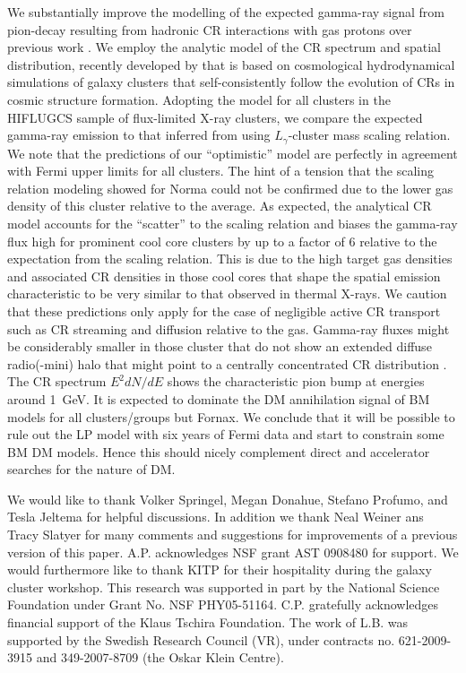 \documentclass[10pt,aps,pra,reprint,amsmath,amsfonts,amssymb,showpacs,nofootinbib,floatfix]{revtex4-1}
\begin{document}
We substantially improve the modelling of the expected gamma-ray
signal from pion-decay resulting from hadronic CR interactions with
gas protons over previous work \citep{2010ApJ...717L..71A}. We employ
the analytic model of the CR spectrum and spatial distribution,
recently developed by \citet{2010MNRAS.409..449P} that is based on
cosmological hydrodynamical simulations of galaxy clusters that self-consistently follow
the evolution of CRs in cosmic structure formation. Adopting the model
for all clusters in the HIFLUGCS sample of flux-limited X-ray
clusters, we compare the expected gamma-ray emission to that inferred
from using $L_\gamma$-cluster mass scaling relation. We note that the
predictions of our ``optimistic'' model are perfectly in agreement
with Fermi upper limits for all clusters.  The hint of a tension that
the scaling relation modeling showed for Norma
\citep{2010ApJ...717L..71A} could not be confirmed due to the
 lower gas density of this cluster relative to the average.
As expected, the analytical CR model accounts for the ``scatter'' to the scaling
relation and biases the gamma-ray flux high for prominent cool core
clusters by up to a factor of 6 relative to the expectation from the
scaling relation. This is due to the high target gas densities and
associated CR densities in those cool cores that shape the spatial
emission characteristic to be very similar to that observed in thermal
X-rays. We caution that these predictions only apply for the case of
negligible active CR transport such as CR streaming and diffusion
relative to the gas. Gamma-ray fluxes might be considerably smaller in those
cluster that do not show an extended diffuse radio(-mini) halo that
might point to a centrally concentrated CR distribution
\citep{2011A&A...527A..99E}. The CR spectrum $E^2 dN/dE$ shows the
characteristic pion bump at energies around 1~GeV. It is expected to
dominate the DM annihilation signal of BM models for all
clusters/groups but Fornax. We conclude that it will be possible to
rule out the LP model with six years of Fermi data and start to
constrain some BM DM models. Hence this should nicely complement
direct and accelerator searches for the nature of DM.






\smallskip We would like to thank Volker Springel, Megan Donahue,
Stefano Profumo, and Tesla Jeltema for helpful discussions.  In
addition we thank Neal Weiner ans Tracy Slatyer for many comments and
suggestions for improvements of a previous version of this
paper. A.P. acknowledges NSF grant AST 0908480 for support. We would
furthermore like to thank KITP for their hospitality during the galaxy
cluster workshop.  This research was supported in part by the National
Science Foundation under Grant No. NSF PHY05-51164.  C.P. gratefully
acknowledges financial support of the Klaus Tschira Foundation. The
work of L.B. was supported by the Swedish Research Council (VR), under
contracts no. 621-2009-3915 and 349-2007-8709 (the Oskar Klein
Centre).
\end{document}
